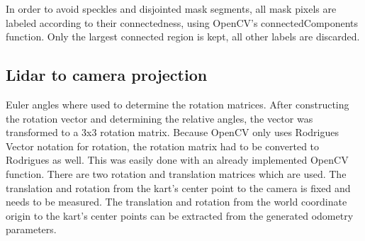 In order to avoid speckles and disjointed mask segments, all mask pixels are labeled according to their connectedness, using OpenCV's connectedComponents function. Only the largest connected region is kept, all other labels are discarded. 

\subsection{Lidar to camera projection}

Euler angles where used to determine the rotation matrices. After constructing the rotation vector and determining the relative angles, the vector was transformed to a 3x3 rotation matrix. Because OpenCV only uses Rodrigues Vector notation for rotation, the rotation matrix had to be converted to Rodrigues as well. This was easily done with an already implemented OpenCV function.
There are two rotation and translation matrices which are used. The translation and rotation from the kart's center point to the camera is fixed and needs to be measured. The translation and rotation from the world coordinate origin to the kart's center points can be extracted from the generated odometry parameters.